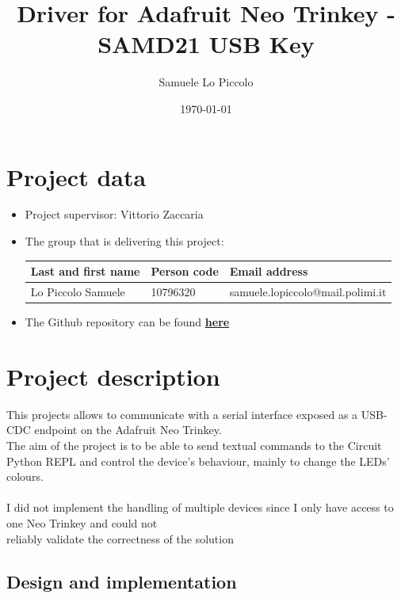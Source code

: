 \documentclass[10pt,a4]{article}
\author{Samuele Lo Piccolo}
\date{\today}
\title{Driver for Adafruit Neo Trinkey - SAMD21 USB Key}
\begin{document}
\maketitle
\tableofcontents

\section{Project data}

\begin{itemize}
\item 
  Project supervisor: Vittorio Zaccaria

\item 
The group that is delivering this project:

\begin{center}
\begin{tabular}{lll}
Last and first name & Person code & Email address\\
\hline
  Lo Piccolo Samuele & 10796320 & samuele.lopiccolo@mail.polimi.it \\               
\end{tabular}
\end{center}

\item The Github repository can be found \href{https://github.com/Samuele-LP/AOS}{\textbf{here}}

\end{itemize}


\section{Project description}



This projects allows to communicate with a serial interface exposed as a USB-CDC endpoint on the Adafruit Neo Trinkey.\\
The aim of the project is to be able to send textual commands to the Circuit Python REPL and control the device's behaviour, mainly to change the LEDs' colours.\\\\
I did not implement the handling of multiple devices since I only have access to one Neo Trinkey and could not \\reliably validate the correctness of the solution


\subsection{Design and implementation}
\end{document}
